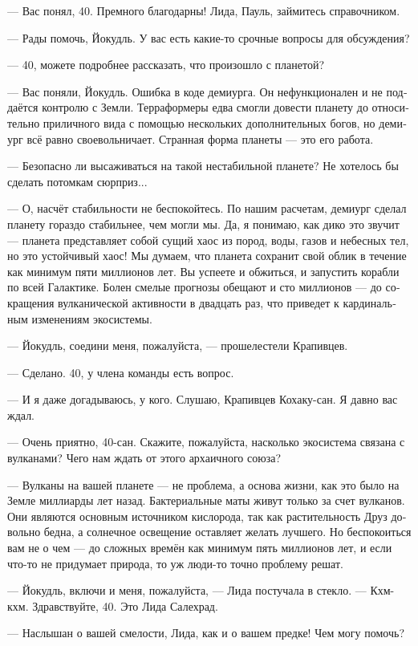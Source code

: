 \documentclass[a4paper,12pt,fleqn]{book}\usepackage{cooltooltips}\usepackage{polyglossia}\setdefaultlanguage[babelshorthands=true]{russian}\setotherlanguage{english}\defaultfontfeatures{Ligatures=TeX,Mapping=tex-text} \usepackage{xcolor}\definecolor{lightgray}{HTML}{bbbbbb}\color{lightgray}\newcommand{\ml}[3]{\textenglish{\textcolor{black}{#3}}}
\begin{document}
--- Вас понял, 40.
Премного благодарны!
Лида, Пауль, займитесь справочником.

--- Рады помочь, Йокудль.
У вас есть какие-то срочные вопросы для обсуждения?

--- 40, можете подробнее рассказать, что произошло с планетой?

--- Вас поняли, Йокудль.
Ошибка в коде демиурга.
Он нефункционален и не поддаётся контролю с Земли.
Терраформеры едва смогли довести планету до относительно приличного вида с помощью нескольких дополнительных богов, но демиург всё равно своевольничает.
Странная форма планеты --- это его работа.

--- Безопасно ли высаживаться на такой нестабильной планете?
Не хотелось бы сделать потомкам сюрприз...

--- О, насчёт стабильности не беспокойтесь.
По нашим расчетам, демиург сделал планету гораздо стабильнее, чем могли мы.
Да, я понимаю, как дико это звучит --- планета представляет собой сущий хаос из пород, воды, газов и небесных тел, но это устойчивый хаос!
Мы думаем, что планета сохранит свой облик в течение как минимум пяти миллионов лет.
Вы успеете и обжиться, и запустить корабли по всей Галактике.
Болен смелые прогнозы обещают и сто миллионов --- до сокращения вулканической активности в двадцать раз, что приведет к кардинальным изменениям экосистемы.

--- Йокудль, соедини меня, пожалуйста, --- прошелестели Крапивцев.

--- Сделано.
40, у члена команды есть вопрос.

--- И я даже догадываюсь, у кого.
Слушаю, Крапивцев Кохаку-сан.
Я давно вас ждал.

--- Очень приятно, 40-сан.
Скажите, пожалуйста, насколько экосистема связана с вулканами?
Чего нам ждать от этого архаичного союза?

--- Вулканы на вашей планете --- не проблема, а основа жизни, как это было на Земле миллиарды лет назад.
Бактериальные маты живут только за счет вулканов.
Они являются основным источником кислорода, так как растительность Друз довольно бедна, а солнечное освещение оставляет желать лучшего.
Но беспокоиться вам не о чем --- до сложных времён как минимум пять миллионов лет, и если что-то не придумает природа, то уж люди-то точно проблему решат.

--- Йокудль, включи и меня, пожалуйста, --- Лида постучала в стекло.
--- Кхм-кхм.
Здравствуйте, 40.
Это Лида Салехрад.

--- Наслышан о вашей смелости, Лида, как и о вашем предке!
Чем могу помочь?
\end{document}

